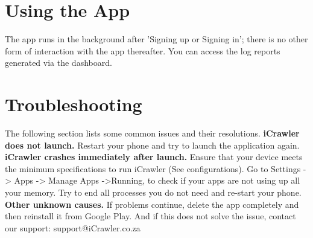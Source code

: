 \documentclass[hidelinks, 12pt, oneside]{article}
\begin{document}
	 
	\section{Using the App}
	The app runs in the background after 'Signing up or Signing in'; there is no other form of interaction with 
	the app thereafter. You can access the log reports generated via the dashboard.
	\newline\newline
	
	\section{Troubleshooting}
	The following section lists some common issues and their resolutions.
	\textbf{iCrawler does not launch.}
	Restart your phone and try to launch the application again.
	\textbf{iCrawler crashes immediately after launch.}
	Ensure that your device meets the minimum specifications to run iCrawler (See configurations).
	Go to Settings -> Apps -> Manage Apps ->Running, to check if your apps are not using up all your memory. Try to end all processes you do not need and re-start your phone.
	\textbf{Other unknown causes.}
	 If problems continue, delete the app completely and then reinstall it from Google Play. And if this does not solve the issue, contact our support: support@iCrawler.co.za\
			
\end{document}
